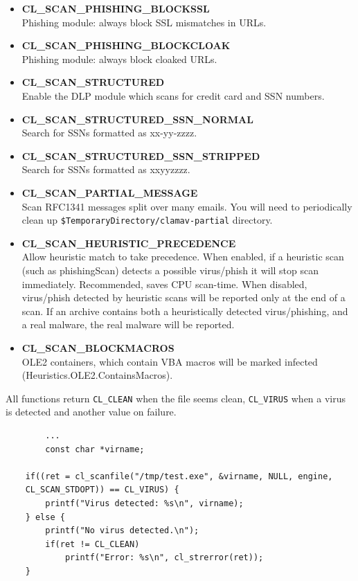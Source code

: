 \documentclass[a4paper,titlepage,12pt]{article}
\begin{document}
\begin{itemize}
	\item \textbf{CL\_SCAN\_PHISHING\_BLOCKSSL}\\
	      Phishing module: always block SSL mismatches in URLs.
	\item \textbf{CL\_SCAN\_PHISHING\_BLOCKCLOAK}\\
	      Phishing module: always block cloaked URLs.
	\item \textbf{CL\_SCAN\_STRUCTURED}\\
	      Enable the DLP module which scans for credit card and SSN
	      numbers.
	\item \textbf{CL\_SCAN\_STRUCTURED\_SSN\_NORMAL}\\
	      Search for SSNs formatted as xx-yy-zzzz.
	\item \textbf{CL\_SCAN\_STRUCTURED\_SSN\_STRIPPED}\\
	      Search for SSNs formatted as xxyyzzzz.
	\item \textbf{CL\_SCAN\_PARTIAL\_MESSAGE}\\
	      Scan RFC1341 messages split over many emails. You will need to
	      periodically clean up \verb+$TemporaryDirectory/clamav-partial+
	      directory.
	\item \textbf{CL\_SCAN\_HEURISTIC\_PRECEDENCE}\\
	      Allow heuristic match to take precedence. When enabled, if
	      a heuristic scan (such as phishingScan) detects a possible
	      virus/phish it will stop scan immediately. Recommended, saves CPU
	      scan-time. When disabled, virus/phish detected by heuristic scans
	      will be reported only at the end of a scan. If an archive
	      contains both a heuristically detected virus/phishing, and a real
	      malware, the real malware will be reported.
	\item \textbf{CL\_SCAN\_BLOCKMACROS}\\
	      OLE2 containers, which contain VBA macros will be marked infected
	      (Heuristics.OLE2.ContainsMacros).
    \end{itemize}
    All functions return \verb+CL_CLEAN+ when the file seems clean,
    \verb+CL_VIRUS+ when a virus is detected and another value on failure.
    \begin{verbatim}
	    ...
	    const char *virname;

	if((ret = cl_scanfile("/tmp/test.exe", &virname, NULL, engine,
	CL_SCAN_STDOPT)) == CL_VIRUS) {
	    printf("Virus detected: %s\n", virname);
	} else {
	    printf("No virus detected.\n");
	    if(ret != CL_CLEAN)
	        printf("Error: %s\n", cl_strerror(ret));
	}
    \end{verbatim}
\end{document}
